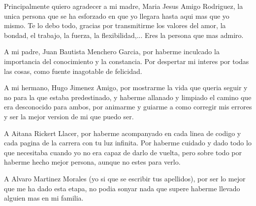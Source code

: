 
Principalmente quiero agradecer a mi madre, Maria Jesus Amigo Rodriguez, la unica persona que se ha esforzado en que yo llegara hasta aqui mas que yo mismo. Te lo debo todo, gracias por transmitirme los valores del amor, la bondad, el trabajo, la fuerza, la flexibilidad,... Eres la persona que mas admiro.

A mi padre, Juan Bautista Menchero Garcia, por haberme inculcado la importancia del conocimiento y la constancia. Por despertar mi interes por todas las cosas, como fuente inagotable de felicidad.

A mi hermano, Hugo Jimenez Amigo, por mostrarme la vida que queria seguir y no para la que estaba predestinado, y haberme allanado y limpiado el camino que era desconocido para ambos, por animarme y guiarme a como corregir mis errores y ser la mejor version de mi que puedo ser.

A Aitana Rickert Llacer, por haberme acompanyado en cada linea de codigo y cada pagina de la carrera con tu luz infinita. Por haberme cuidado y dado todo lo que necesitaba cuando yo no era capaz de darlo de vuelta, pero sobre todo por haberme hecho mejor persona, aunque no estes para verlo.

A Alvaro Martinez Morales (yo si que se escribir tus apellidos), por ser lo mejor que me ha dado esta etapa, no podia sonyar nada que supere haberme llevado alguien mas en mi familia.
